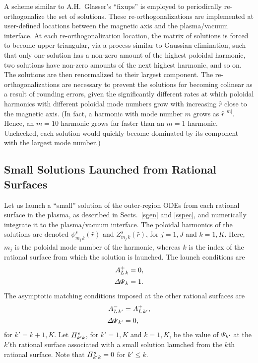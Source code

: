 \documentclass[12pt,prb,aps]{revtex4-1}
\begin{document}
A scheme similar to A.H.~Glasser's ``fixups'' \cite{ham} is employed to periodically re-orthogonalize the set of solutions. These  re-orthogonalizations are implemented at user-defined locations between the magnetic axis and the plasma/vacuum interface.  At each re-orthogonalization location, the matrix of solutions is forced to become upper triangular, via a process similar to Gaussian elimination, such that only one solution has a non-zero amount of the highest poloidal  harmonic, two solutions have non-zero amounts of the next highest harmonic, and so on. The solutions are then renormalized to their largest component. 
 The re-orthogonalizations are
 necessary to prevent the solutions for becoming colinear as a result of rounding errors, given the significantly
 different rates at which poloidal harmonics with different poloidal mode numbers grow with increasing $\hat{r}$  close to the magnetic axis. (In fact, a
 harmonic with mode number $m$ grows as $\hat{r}^{\,|m|}$. Hence, an $m=10$ harmonic  grows far faster than an $m=1$ harmonic. Unchecked, each solution
 would quickly become dominated by its component with the largest mode number.)

\subsection{Small Solutions Launched from Rational Surfaces}\label{smalll}
Let us launch a ``small'' solution of the outer-region ODEs  from each rational surface in the plasma, as described in Sects.~\ref{sgen} and \ref{sspec}, 
 and numerically integrate it to the plasma/vacuum interface. The poloidal harmonics of
the solutions are denoted $\psi^s_{m_{j}\,k}(\hat{r})$ and $Z^s_{m_{j}\,k}(\hat{r})$, for $j=1,J$ and $k=1,K$. Here,
$m_{j}$ is the poloidal mode number of the harmonic, whereas $k$ is the index of the rational surface from which the solution is launched.
The launch conditions are
\begin{align}
A_{L\,k}^+ &=  0,\\[0.5ex]
{\mit\Delta\Psi}_k &=1.
\end{align}
The asymptotic matching conditions imposed at the other rational surfaces are
\begin{align}
A_{L\,k'}^{-} &= A_{L\,k'}^+,\\[0.5ex]
{\mit\Delta\Psi}_{k'} &= 0,
\end{align}
for $k'=k+1,K$.
Let 
${\mit\Pi}_{k'k}^s$, for $k'=1,K$ and $k=1,K$,  be the value of ${\mit\Psi}_{k'}$ at the $k'$th rational surface associated with a small solution
launched from the $k$th rational surface. Note that ${\mit\Pi}_{k'k}^s=0$ for $k' \leq k$.  
\end{document}

